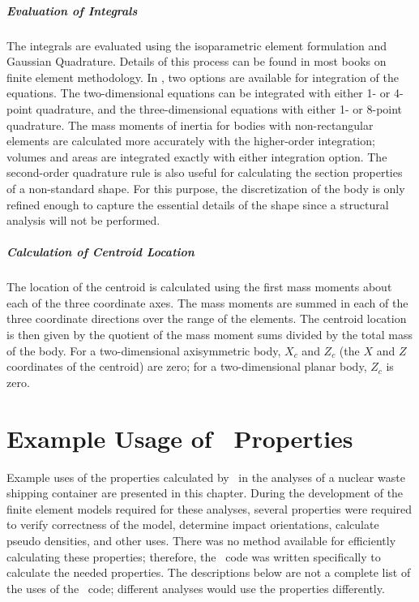 \paragraph*{Evaluation of Integrals} The integrals are evaluated using
the isoparametric element formulation and Gaussian Quadrature.
Details of this process can be found in most books on finite element
methodology.  In \NUM, two options are available for integration of
the equations.  The two-dimensional equations can be integrated with
either 1- or 4-point quadrature, and the three-dimensional equations
with either 1- or 8-point quadrature.  The mass moments of inertia for
bodies with non-rectangular elements are calculated more accurately
with the higher-order integration; volumes and areas are integrated
exactly with either integration option.  The second-order quadrature
rule is also useful for calculating the section properties of a
non-standard shape.  For this purpose, the discretization of the body
is only refined enough to capture the essential details of the shape
since a structural analysis will not be performed. 

\paragraph{Calculation of Centroid Location} The location of the
centroid is calculated using the first mass moments about each of the
three coordinate axes.  The mass moments are summed in each of the
three coordinate directions over the range of the elements.  The
centroid location is then given by the quotient of the mass moment
sums divided by the total mass of the body.  For a two-dimensional
axisymmetric body, $X_c$ and $Z_c$ (the $X$ and $Z$ coordinates of the
centroid) are zero; for a two-dimensional planar body,
$Z_c$ is zero.  

\chapter{Example Usage of \NUM\ Properties}

Example uses of the properties calculated by \NUM\ in the analyses of
a nuclear waste shipping container are presented in this chapter.
During the development of the finite element models required for these
analyses, several properties were required to verify correctness of
the model, determine impact orientations, calculate pseudo densities,
and other uses. There was no method available for efficiently
calculating these properties; therefore, the \NUM\ code was written
specifically to calculate the needed properties.  The descriptions
below are not a complete list of the uses of the \NUM\ code; different
analyses would use the properties differently. 

